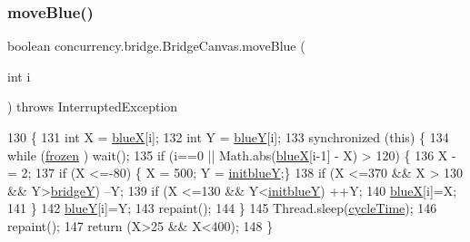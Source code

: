 \subsubsection{\texorpdfstring{move\+Blue()}{moveBlue()}}
{\footnotesize\ttfamily boolean concurrency.\+bridge.\+Bridge\+Canvas.\+move\+Blue (\begin{DoxyParamCaption}\item[{int}]{i }\end{DoxyParamCaption}) throws Interrupted\+Exception\hspace{0.3cm}{\ttfamily [inline]}}


\begin{DoxyCode}
130                                                                \{
131         \textcolor{keywordtype}{int} X = \mbox{\hyperlink{classconcurrency_1_1bridge_1_1_bridge_canvas_a5f11f5f30befee832aacd3795a93088f}{blueX}}[i];
132         \textcolor{keywordtype}{int} Y = \mbox{\hyperlink{classconcurrency_1_1bridge_1_1_bridge_canvas_a6673d04f80b8b4bea8d99120907abed5}{blueY}}[i];
133         \textcolor{keyword}{synchronized} (\textcolor{keyword}{this}) \{
134             \textcolor{keywordflow}{while} (\mbox{\hyperlink{classconcurrency_1_1bridge_1_1_bridge_canvas_a1f2ccdf0586d82761c1c372e24643c0e}{frozen}} ) wait();
135             \textcolor{keywordflow}{if} (i==0 || Math.abs(\mbox{\hyperlink{classconcurrency_1_1bridge_1_1_bridge_canvas_a5f11f5f30befee832aacd3795a93088f}{blueX}}[i-1] - X) > 120) \{
136                 X -= 2;
137                 \textcolor{keywordflow}{if} (X <=-80) \{ X = 500; Y = \mbox{\hyperlink{classconcurrency_1_1bridge_1_1_bridge_canvas_a8cd98ed2b254d9f99152833053f1d85c}{initblueY}};\}
138                 \textcolor{keywordflow}{if} (X <=370 && X > 130 && Y>\mbox{\hyperlink{classconcurrency_1_1bridge_1_1_bridge_canvas_acf28c3801b04a1ddf864888e06d0cc4a}{bridgeY}}) --Y;
139                 \textcolor{keywordflow}{if} (X <=130 && Y<\mbox{\hyperlink{classconcurrency_1_1bridge_1_1_bridge_canvas_a8cd98ed2b254d9f99152833053f1d85c}{initblueY}}) ++Y;
140                 \mbox{\hyperlink{classconcurrency_1_1bridge_1_1_bridge_canvas_a5f11f5f30befee832aacd3795a93088f}{blueX}}[i]=X;
141             \}
142             \mbox{\hyperlink{classconcurrency_1_1bridge_1_1_bridge_canvas_a6673d04f80b8b4bea8d99120907abed5}{blueY}}[i]=Y;
143             repaint();
144         \}
145         Thread.sleep(\mbox{\hyperlink{classconcurrency_1_1bridge_1_1_bridge_canvas_a65748edb1df4eae39a0c357cd9db326e}{cycleTime}});
146         repaint();
147         \textcolor{keywordflow}{return} (X>25 && X<400);
148     \}
\end{DoxyCode}
\mbox{\label{classconcurrency_1_1bridge_1_1_bridge_canvas_a166d001c782d362f3a8aca27e493a074}} 
